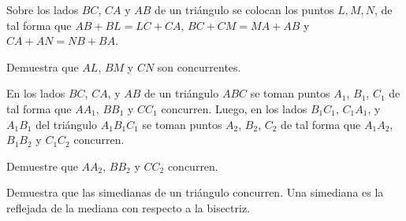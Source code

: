 \begin{problema}
Sobre los lados $BC$, $CA$ y $AB$ de un triángulo se colocan los puntos $L, M, N$, de tal forma que $AB+BL=LC+CA$,  $BC+CM=MA+AB$ y $CA+AN=NB+BA$.

Demuestra que $AL$, $BM$ y $CN$ son concurrentes.
\end{problema}

\begin{problema}
En los lados $BC$, $CA$, y $AB$ de un triángulo $ABC$ se toman puntos $A_1$, $B_1$, $C_1$ de tal forma que $AA_1$, $BB_1$ y $CC_1$ concurren. Luego, en los lados $B_1C_1$, $C_1A_1$, y $A_1B_1$ del triángulo $A_1B_1C_1$ se toman puntos $A_2$, $B_2$, $C_2$ de tal forma que $A_1A_2$, $B_1B_2$ y $C_1C_2$ concurren.

Demuestre que $AA_2$, $BB_2$ y $CC_2$ concurren.
\end{problema}


\begin{problema}
Demuestra que las simedianas de un triángulo concurren. Una simediana es la reflejada de la mediana con respecto a la bisectriz.
\end{problema}
\newpage

\newpage





















